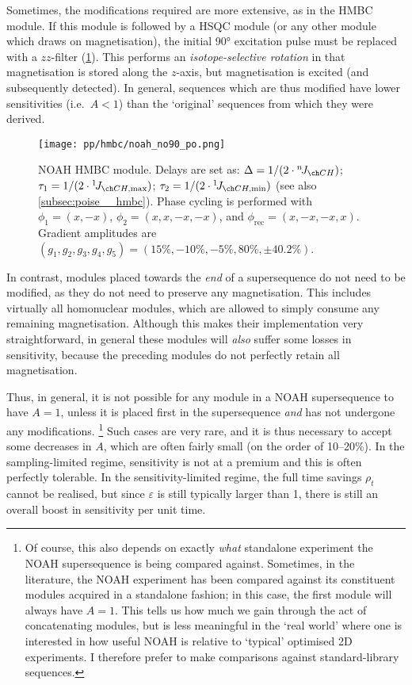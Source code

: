 Sometimes, the modifications required are more extensive, as in the HMBC module.
If this module is followed by a HSQC module (or any other module which draws on  magnetisation), the initial \ang{90} excitation pulse must be replaced with a $zz$-filter (\cref{fig:noah_hmbc_no90_po}).
This performs an \textit{isotope-selective rotation} in that  magnetisation is stored along the $z$-axis, but  magnetisation is excited (and subsequently detected).
In general, sequences which are thus modified have lower sensitivities (i.e.\ $A < 1$) than the `original' sequences from which they were derived.

\begin{figure}[htb]
    \centering
    \texttt{[image: pp/hmbc/noah\_no90\_po.png]}%
    \caption[NOAH HMBC module with product operator analysis]{
        NOAH HMBC module.
    Delays are set as: $\Delta = 1 / (2 \cdot \nJ{CH})$; $\tau_1 = 1 / (2 \cdot \oneJ{CH,\text{max}})$; $\tau_2 = 1 / (2 \cdot \oneJ{CH,\text{min}})$ (see also \cref{subsec:poise__hmbc}).
        Phase cycling is performed with $\phi_1 = (x, -x)$, $\phi_2 = (x, x, -x, -x)$, and $\phi_\text{rec} = (x, -x, -x, x)$.
        Gradient amplitudes are $(g_1, g_2, g_3, g_4, g_5) = (15\%, -10\%, -5\%, 80\%, \pm40.2\%)$.
    }
    \label{fig:noah_hmbc_no90_po}
\end{figure}

In contrast, modules placed towards the \textit{end} of a supersequence do not need to be modified, as they do not need to preserve any magnetisation.
This includes virtually all homonuclear modules, which are allowed to simply consume any remaining magnetisation.
Although this makes their implementation very straightforward, in general these modules will \textit{also} suffer some losses in sensitivity, because the preceding modules do not perfectly retain all magnetisation.

Thus, in general, it is not possible for any module in a NOAH supersequence to have $A = 1$, unless it is placed first in the supersequence \textit{and} has not undergone any modifications.%
\footnote{Of course, this also depends on exactly \textit{what} standalone experiment the NOAH supersequence is being compared against. Sometimes, in the literature, the NOAH experiment has been compared against its constituent modules acquired in a standalone fashion; in this case, the first module will always have $A = 1$. This tells us how much we gain through the act of concatenating modules, but is less meaningful in the `real world' where one is interested in how useful NOAH is relative to `typical' optimised 2D experiments. I therefore prefer to make comparisons against standard-library sequences.}
Such cases are very rare, and it is thus necessary to accept some decreases in $A$, which are often fairly small (on the order of 10--20\%).
In the sampling-limited regime, sensitivity is not at a premium and this is often perfectly tolerable.
In the sensitivity-limited regime, the full time savings $\rho_t$ cannot be realised, but since $\varepsilon$ is still typically larger than 1, there is still an overall boost in sensitivity per unit time.
